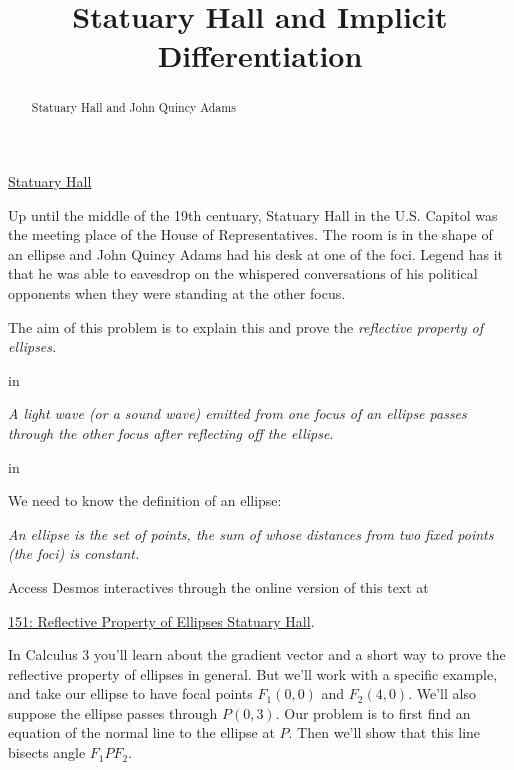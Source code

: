 \documentclass{ximera}
\title{Statuary Hall and Implicit Differentiation}
\newcommand{\pskip}{\vskip 0.1 in}
\begin{document}
\begin{abstract}
Statuary Hall and John Quincy Adams
\end{abstract}
\maketitle


\begin{question}  \label{Q656g5y4546}

\begin{center}
\end{center}

\href{https://www.youtube.com/watch?v=FX6rUU_74kk}{Statuary Hall}


Up until the middle of the 19th centuary, Statuary Hall in the U.S. Capitol was the meeting place of the House of Representatives. The room is in the shape of an ellipse and John Quincy Adams had his desk at one of the foci. Legend has it that he was able to eavesdrop on the whispered conversations of his political opponents when they were standing at the other focus.

The aim of this problem is to explain this and prove the \emph{reflective property of ellipses.}

\pskip

\emph{A light wave (or a sound wave) emitted from one focus of an ellipse passes through the other focus after reflecting off the ellipse.}

\pskip

We need to know the definition of an ellipse:

\emph{An ellipse is the set of points, the sum of whose distances from two fixed points (the foci) is constant.} 

\begin{onlineOnly}
    \begin{center}
\end{center}
\end{onlineOnly}

Access Desmos interactives through the online version of this text at
 
\href{https://https://www.desmos.com/calculator/hodpduouni}{151: Reflective Property of Ellipses Statuary Hall}.

In Calculus 3 you'll learn about the gradient vector and a short way to prove the reflective property of ellipses in general. But we'll work with a specific example, and take our ellipse to have focal points $F_1(0,0)$ and $F_2(4,0)$. We'll also suppose the ellipse passes through $P(0,3)$. Our problem is to first find an equation of the normal line to the ellipse at $P$. Then we'll show that this line bisects angle $F_1PF_2$. 


\end{question}
\end{document}
